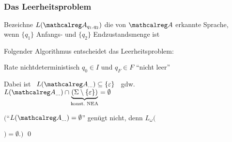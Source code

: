     \begin{frame}
      \frametitle{Das Leerheitsproblem}

      Bezeichne $L(\Aut{A}_{q_1,q_2})$
      die von $\Aut{A}$  erkannte Sprache,\\
      wenn $\{q_1\}$ Anfangs- und $\{q_2\}$ Endzustandsmenge ist

      \par\bigskip
      Folgender Algorithmus entscheidet das Leerheitsproblem:
      \begin{block}{}
        \renewcommand{\baselinestretch}{1.2}
        \begin{algorithm}[H]
          \DontPrintSemicolon

          Rate nichtdeterministisch $q_0 \in I$ und $q_F \in F$\;
          \Return "`nicht leer"'        
        \end{algorithm}
      \end{block}

      Dabei ist~ $L(\Amc_{\dots}) \subseteq \{\varepsilon\}$ ~gdw.~ $L(\Amc_{\dots}) \cap \underbrace{(\Sigma \setminus \{\varepsilon\})}_{\text{konst.\ NEA}} = \emptyset$
      
      \parI
      $\Big($"`$L(\Amc_{\dots}) = \emptyset$"' genügt nicht, denn $L_\omega($
      \hspace*{-2mm}%
      $) = \emptyset%
      .\Big)$
      \qed
      


\end{frame}
